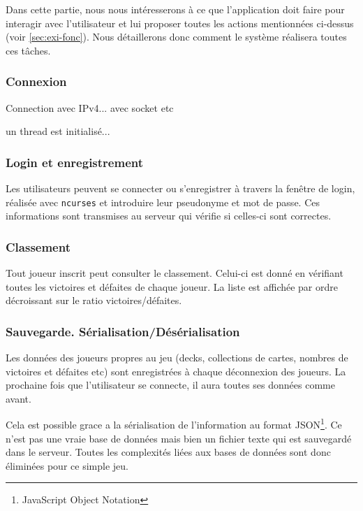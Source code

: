 \documentclass[11pt,a4paper]{article}
\begin{document}
Dans cette partie, nous nous intéresserons à ce que l'application doit
faire pour interagir avec l'utilisateur et lui proposer toutes les
actions mentionnées ci-dessus (voir \ref{sec:exi-fonc}). Nous détaillerons
donc comment le système réalisera toutes ces tâches.

\subsubsection*{Connexion}

Connection avec IPv4... avec socket etc

un thread est initialisé...

\subsubsection*{Login et enregistrement}

Les utilisateurs peuvent se connecter ou s'enregistrer à travers la
fenêtre de login, réalisée avec \texttt{ncurses} et introduire leur
pseudonyme et mot de passe. Ces informations sont transmises au serveur
qui vérifie si celles-ci sont correctes.


\subsubsection*{Classement}

Tout joueur inscrit peut consulter le classement. Celui-ci est donné en
vérifiant toutes les victoires et défaites de chaque joueur. La liste
est affichée par ordre décroissant sur le ratio victoires/défaites.

\subsubsection*{Sauvegarde. Sérialisation/Désérialisation}

Les données des joueurs propres au jeu (decks,
collections de cartes, nombres de victoires et défaites etc) sont
enregistrées à chaque déconnexion des joueurs. La prochaine fois que
l'utilisateur se connecte, il aura toutes ses données comme avant.

Cela est possible grace a la sérialisation de l'information au format
JSON\footnote{JavaScript Object Notation}. Ce n'est pas une vraie base
de données mais bien un fichier texte qui est sauvegardé dans le
serveur. Toutes les complexités liées aux bases de données sont donc éliminées pour
ce simple jeu.
\end{document}
